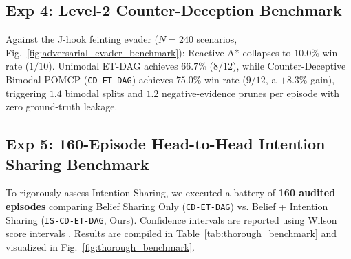 \documentclass[conference]{IEEEtran}
\begin{document}
\subsection{Exp 4: Level-2 Counter-Deception Benchmark}
Against the J-hook feinting evader ($N=240$ scenarios, Fig.~\ref{fig:adversarial_evader_benchmark}): Reactive A* collapses to $10.0\%$ win rate ($1/10$). Unimodal ET-DAG achieves $66.7\%$ ($8/12$), while Counter-Deceptive Bimodal POMCP (\texttt{CD-ET-DAG}) achieves $\mathbf{75.0\%}$ win rate ($9/12$, a $\mathbf{+8.3\%}$ gain), triggering $1.4$ bimodal splits and $1.2$ negative-evidence prunes per episode with zero ground-truth leakage.

\subsection{Exp 5: 160-Episode Head-to-Head Intention Sharing Benchmark}
To rigorously assess Intention Sharing, we executed a battery of \textbf{160 audited episodes} comparing Belief Sharing Only (\texttt{CD-ET-DAG}) vs. Belief + Intention Sharing (\texttt{IS-CD-ET-DAG}, Ours). Confidence intervals are reported using Wilson score intervals \cite{wilson1927probable}. Results are compiled in Table~\ref{tab:thorough_benchmark} and visualized in Fig.~\ref{fig:thorough_benchmark}.

\begin{table}[t]
\centering
\caption{Statistically Rigorous 160-Episode Head-to-Head Benchmark: Belief Sharing vs. Intention Sharing}
\label{tab:thorough_benchmark}
\end{table}
\end{document}
